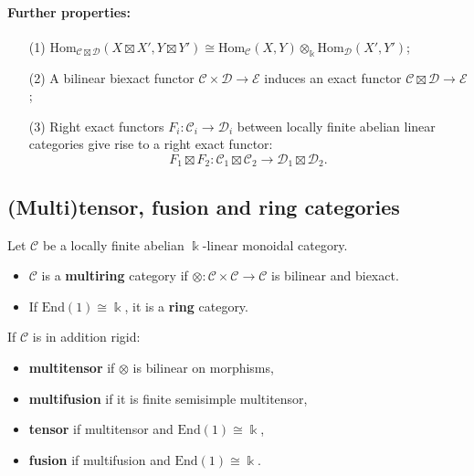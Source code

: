 \documentclass[11pt]{article}
\theoremstyle{definition}
\begin{document}
\paragraph{Further properties:}
\begin{itemize}
  \item[(1)] \( \mathrm{Hom}_{\mathcal{C} \boxtimes \mathcal{D}}(X \boxtimes X', Y \boxtimes Y') \cong \mathrm{Hom}_{\mathcal{C}}(X, Y) \otimes_{\Bbbk} \mathrm{Hom}_{\mathcal{D}}(X', Y') \);
  \item[(2)] A bilinear biexact functor \( \mathcal{C} \times \mathcal{D} \to \mathcal{E} \) induces an exact functor \( \mathcal{C} \boxtimes \mathcal{D} \to \mathcal{E} \);
  \item[(3)] Right exact functors \( F_i: \mathcal{C}_i \to \mathcal{D}_i \) between locally finite abelian linear categories give rise to a right exact functor:
  \[ F_1 \boxtimes F_2: \mathcal{C}_1 \boxtimes \mathcal{C}_2 \to \mathcal{D}_1 \boxtimes \mathcal{D}_2. \]
\end{itemize}

\subsection{(Multi)tensor, fusion and ring categories}
Let \( \mathcal{C} \) be a locally finite abelian \( \Bbbk \)-linear monoidal category.

\begin{itemize}
  \item \( \mathcal{C} \) is a \textbf{multiring} category if \( \otimes: \mathcal{C} \times \mathcal{C} \to \mathcal{C} \) is bilinear and biexact.
  \item If \( \mathrm{End}(1) \cong \Bbbk \), it is a \textbf{ring} category.
\end{itemize}

If \( \mathcal{C} \) is in addition rigid:
\begin{itemize}
  \item \textbf{multitensor} if \( \otimes \) is bilinear on morphisms,
  \item \textbf{multifusion} if it is finite semisimple multitensor,
  \item \textbf{tensor} if multitensor and \( \mathrm{End}(1) \cong \Bbbk \),
  \item \textbf{fusion} if multifusion and \( \mathrm{End}(1) \cong \Bbbk \).
\end{itemize}
\end{document}
